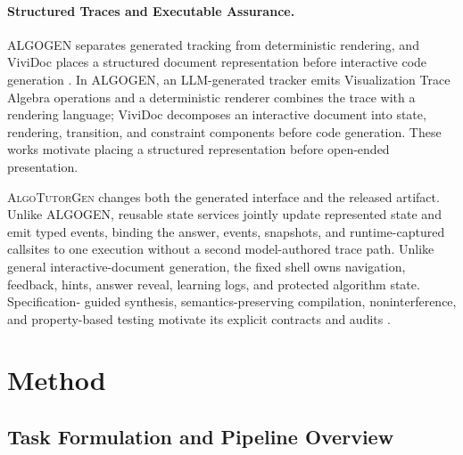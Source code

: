 \documentclass[letterpaper]{article}
\newcommand{\system}{\textsc{AlgoTutorGen}}
\begin{document}
\paragraph{Structured Traces and Executable Assurance.}
ALGOGEN separates generated tracking from deterministic rendering, and
ViviDoc places a structured document representation before interactive
code generation
\citep{anonymous-etal-2026-algogen,tang2026vividoc}. In ALGOGEN, an
LLM-generated tracker emits Visualization Trace Algebra operations and
a deterministic renderer combines the trace with a rendering language;
ViviDoc decomposes an interactive document into state, rendering,
transition, and constraint components before code generation. These
works motivate placing a structured representation before open-ended
presentation.

\system{} changes both the generated interface and the released
artifact. Unlike ALGOGEN, reusable state services jointly update
represented state and emit typed events, binding the answer, events,
snapshots, and runtime-captured callsites to one execution without a
second model-authored trace path. Unlike general interactive-document
generation, the fixed shell owns navigation, feedback, hints, answer
reveal, learning logs, and protected algorithm state. Specification-
guided synthesis, semantics-preserving compilation, noninterference,
and property-based testing motivate its explicit contracts and audits
\citep{SolarLezama2006Sketch,Polikarpova2016Synquid,
Gulwani2017ProgramSynthesis,Leroy2009CompCert,
Goguen1982Noninterference,Claessen2000QuickCheck,
Segura2016Metamorphic}.

\section{Method}
\label{sec:method}

\subsection{Task Formulation and Pipeline Overview}
\label{sec:method_overview}
\end{document}
